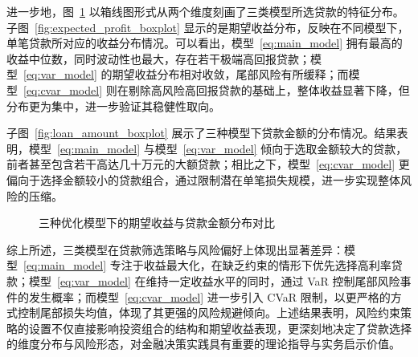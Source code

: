 \documentclass{write_paper}
\begin{document}
进一步地，图~\ref{fig:boxplot_comparison} 以箱线图形式从两个维度刻画了三类模型所选贷款的特征分布。子图~\ref{fig:expected_profit_boxplot} 显示的是期望收益分布，反映在不同模型下，单笔贷款所对应的收益分布情况。可以看出，模型~\ref{eq:main_model} 拥有最高的收益中位数，同时波动性也最大，存在若干极端高回报贷款；模型~\ref{eq:var_model} 的期望收益分布相对收敛，尾部风险有所缓释；而模型~\ref{eq:cvar_model} 则在剔除高风险高回报贷款的基础上，整体收益显著下降，但分布更为集中，进一步验证其稳健性取向。

子图~\ref{fig:loan_amount_boxplot} 展示了三种模型下贷款金额的分布情况。结果表明，模型~\ref{eq:main_model} 与模型~\ref{eq:var_model} 倾向于选取金额较大的贷款，前者甚至包含若干高达几十万元的大额贷款；相比之下，模型~\ref{eq:cvar_model} 更偏向于选择金额较小的贷款组合，通过限制潜在单笔损失规模，进一步实现整体风险的压缩。

\begin{figure}[htbp]
\centering
{}
\caption{三种优化模型下的期望收益与贷款金额分布对比}
\label{fig:boxplot_comparison}
\end{figure}

综上所述，三类模型在贷款筛选策略与风险偏好上体现出显著差异：模型~\ref{eq:main_model} 专注于收益最大化，在缺乏约束的情形下优先选择高利率贷款；模型~\ref{eq:var_model} 在维持一定收益水平的同时，通过 VaR 控制尾部风险事件的发生概率；而模型~\ref{eq:cvar_model} 进一步引入 CVaR 限制，以更严格的方式控制尾部损失均值，体现了其更强的风险规避倾向。上述结果表明，风险约束策略的设置不仅直接影响投资组合的结构和期望收益表现，更深刻地决定了贷款选择的维度分布与风险形态，对金融决策实践具有重要的理论指导与实务启示价值。
\end{document}
